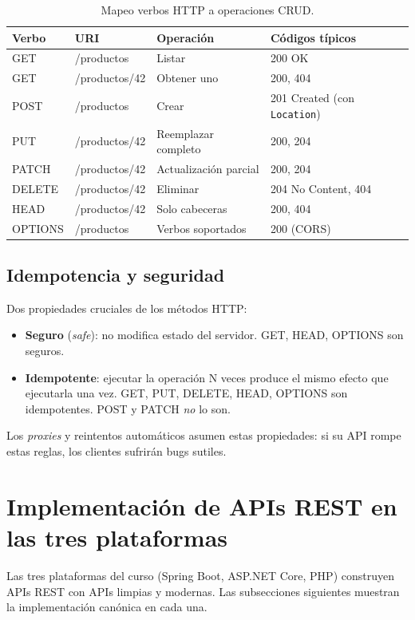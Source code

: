 \documentclass[11pt,a4paper,openany]{book}
\begin{document}
\begin{table}[htbp]
\centering
\caption{Mapeo verbos HTTP a operaciones CRUD.}
\footnotesize
\begin{tabularx}{\textwidth}{llXX}
\toprule
\textbf{Verbo} & \textbf{URI} & \textbf{Operación} & \textbf{Códigos típicos}\\
\midrule
GET & /productos & Listar & 200 OK \\
GET & /productos/42 & Obtener uno & 200, 404 \\
POST & /productos & Crear & 201 Created (con \texttt{Location}) \\
PUT & /productos/42 & Reemplazar completo & 200, 204 \\
PATCH & /productos/42 & Actualización parcial & 200, 204 \\
DELETE & /productos/42 & Eliminar & 204 No Content, 404 \\
HEAD & /productos/42 & Solo cabeceras & 200, 404 \\
OPTIONS & /productos & Verbos soportados & 200 (CORS) \\
\bottomrule
\end{tabularx}
\end{table}

\subsection{Idempotencia y seguridad}

Dos propiedades cruciales de los métodos HTTP:

\begin{itemize}
\item \textbf{Seguro} (\emph{safe}): no modifica estado del servidor.
GET, HEAD, OPTIONS son seguros.
\item \textbf{Idempotente}: ejecutar la operación N veces produce el
mismo efecto que ejecutarla una vez. GET, PUT, DELETE, HEAD, OPTIONS
son idempotentes. POST y PATCH \emph{no} lo son.
\end{itemize}

Los \emph{proxies} y reintentos automáticos asumen estas propiedades:
si su API rompe estas reglas, los clientes sufrirán bugs sutiles.

\section{Implementación de APIs REST en las tres plataformas}

Las tres plataformas del curso (Spring Boot, ASP.NET Core,
PHP) construyen APIs REST con APIs limpias y modernas. Las
subsecciones siguientes muestran la implementación canónica en cada
una.
\end{document}
